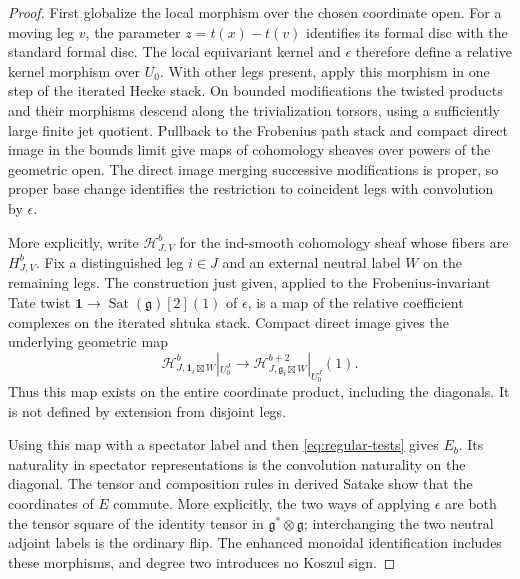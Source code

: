 \documentclass[11pt]{article}
\numberwithin{equation}{section}
\theoremstyle{definition}
\theoremstyle{remark}
\newcommand{\g}{\mathfrak g}
\newcommand{\Sat}{\operatorname{Sat}}
\begin{document}
\begin{proof}
First globalize the local morphism over the chosen coordinate open.
For a moving leg $v$, the parameter $z=t(x)-t(v)$ identifies its
formal disc with the standard formal disc.  The local equivariant
kernel and $\epsilon$ therefore define a relative kernel morphism
over $U_0$.  With other legs present, apply this morphism in one step
of the iterated Hecke stack.  On bounded modifications the twisted
products and their morphisms descend along the trivialization torsors,
using a sufficiently large finite jet quotient.  Pullback to the
Frobenius path stack and compact direct image in the bounds limit give
maps of cohomology sheaves over powers of the geometric open.
The direct image merging successive modifications is proper, so
proper base change identifies the restriction to coincident legs with
convolution by $\epsilon$.

More explicitly, write $\mathcal H^b_{J,V}$ for the ind-smooth
cohomology sheaf whose fibers are $H^b_{J,V}$.  Fix a distinguished
leg $i\in J$ and an external neutral label $W$ on the remaining
legs.  The construction just given, applied to the Frobenius-invariant
Tate twist $\mathbf1\to\Sat(\g)[2](1)$ of $\epsilon$, is a map
of the relative coefficient complexes on the iterated shtuka stack.
Compact direct image gives the underlying geometric map
\begin{equation}\label{glob:eq-relative-epsilon}
 \mathcal H^b_{J,\mathbf1_i\boxtimes W}|_{U_0^J}
       \longrightarrow
 \mathcal H^{b+2}_{J,\g_i\boxtimes W}|_{U_0^J}(1).
\end{equation}
Thus this map exists on the entire coordinate product, including
the diagonals.  It is not defined by extension from disjoint legs.

Using this map with a spectator label and then
\eqref{eq:regular-tests} gives $E_b$.  Its naturality in spectator
representations is the convolution naturality on the diagonal.  The
tensor and composition rules in derived Satake show that the
coordinates of $E$ commute.  More explicitly, the two ways of applying
$\epsilon$ are both the tensor square of the identity tensor in
$\g^*\otimes\g$; interchanging the two neutral adjoint labels is
the ordinary flip.  The enhanced monoidal identification includes
these morphisms, and degree two introduces no Koszul sign.


\end{proof}
\end{document}
